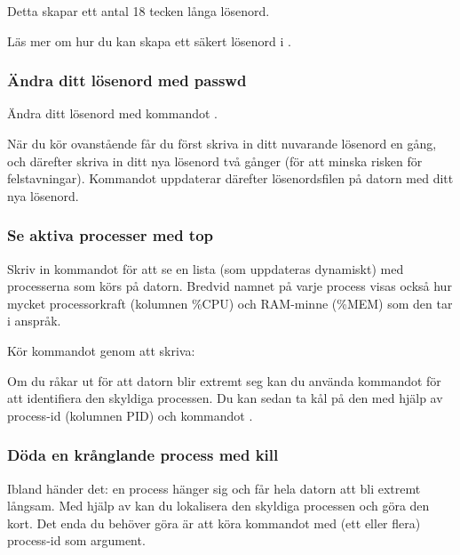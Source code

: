 \documentclass[a4paper,final]{memoir} %
\begin{document}

Detta skapar ett antal 18 tecken långa lösenord.

Läs mer om hur du kan skapa ett säkert lösenord i .

\subsubsection{Ändra ditt lösenord med passwd} 

Ändra ditt lösenord med kommandot .


När du kör ovanstående får du först skriva in ditt nuvarande lösenord en gång, och därefter skriva in ditt nya lösenord två gånger (för att minska risken för felstavningar). Kommandot uppdaterar därefter lösenordsfilen på datorn med ditt nya lösenord.

\subsubsection{Se aktiva processer med top} 

Skriv in kommandot  för att se en lista (som uppdateras dynamiskt) med processerna som körs på datorn. Bredvid namnet på varje process visas också hur mycket processorkraft (kolumnen \%CPU) och RAM-minne (\%MEM) som den tar i anspråk. 

Kör kommandot genom att skriva:


Om du råkar ut för att datorn blir extremt seg kan du använda kommandot för att identifiera den skyldiga processen. Du kan sedan ta kål på den med hjälp av process-id (kolumnen PID) och kommandot .

\subsubsection{Döda en krånglande process med kill} 

Ibland händer det: en process hänger sig och får hela datorn att bli extremt långsam. Med hjälp av  kan du lokalisera den skyldiga processen och göra den kort. Det enda du behöver göra är att köra kommandot  med (ett eller flera) process-id som argument.

\end{document}
